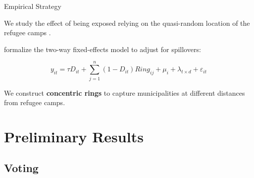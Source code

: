 \documentclass[aspectratio=169]{beamer}
\begin{document}
\begin{frame}[label=Strategy]{Empirical Strategy}

We study the effect of being exposed relying on the quasi-random location of the refugee camps \hyperlink{Balance}{}.

\citet{butts_difference--differences_2023} formalize the two-way fixed-effects model to adjust for spillovers:




\[
y_{it} = \tau D_{it}
+ \sum_{j=1}^{n} (1 - D_{it}) Ring_{ij}
+ \mu_i + \lambda_{t \times d} + \varepsilon_{it}
\]



We construct \textbf{concentric rings} to capture municipalities at different distances from refugee camps. \hyperlink{Buffers}{} \hyperlink{Histogram}{}

\end{frame}

\section{Preliminary Results}

\subsection{Voting}
\end{document}
